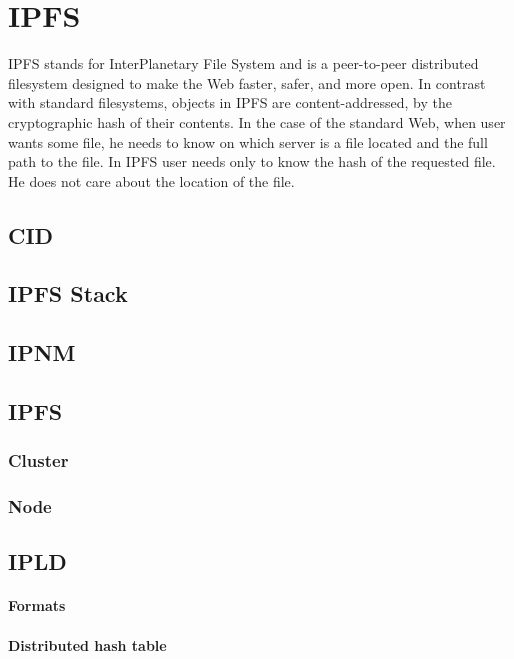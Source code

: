 \chapter{IPFS}

IPFS stands for InterPlanetary File System and is a peer-to-peer distributed filesystem designed to make the Web faster, safer, and more open. In contrast with standard filesystems, objects in IPFS are content-addressed, by the cryptographic hash of their contents. In the case of the standard Web, when user wants some file, he needs to know on which server is a file located and the full path to the file. In IPFS user needs only to know the hash of the requested file. He does not care about the location of the file.

\section{CID}

\section{IPFS Stack}

\section{IPNM}

\section{IPFS}
\subsection{Cluster}
\subsection{Node}

\section{IPLD}
\subsubsection{Formats} 
\subsubsection{Distributed hash table} 







